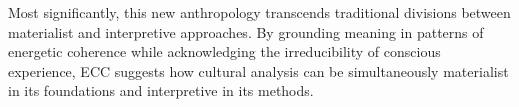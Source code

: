 Most significantly, this new anthropology transcends traditional divisions between materialist and interpretive approaches. By grounding meaning in patterns of energetic coherence while acknowledging the irreducibility of conscious experience, ECC suggests how cultural analysis can be simultaneously materialist in its foundations and interpretive in its methods.








